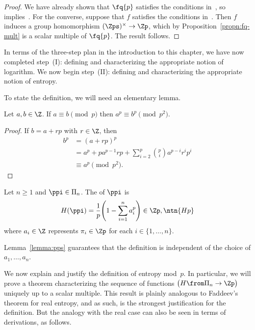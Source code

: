 \begin{proof}
We have already shown that $\fq{p}$ satisfies the conditions
in~, so~
implies~.  For the converse, suppose that $f$
satisfies the conditions in~.  Then $f$ induces a
group homomorphism $(\Zps)^\times \to \Zp$, which by
Proposition~\ref{propn:fq-mult} is a scalar multiple of $\fq{p}$.  The
result follows.
\end{proof}

In terms of the three-step plan in the introduction to this chapter, we
have now completed step~(I): defining and characterizing the appropriate
notion of logarithm.  We now begin step~(II): defining and characterizing
the appropriate notion of entropy.

To state the definition, we will need an elementary lemma.

\begin{lemma}
Let $a, b \in \Z$.  If $a \equiv b \pmod{p}$ then $a^p \equiv b^p
\pmod{p^2}$. 
\end{lemma}

\begin{proof}
If $b = a + rp$ with $r \in \Z$, then
% 
\begin{align*}
b^p     &
= 
(a + rp)^p      \\
&
=
a^p + p a^{p - 1} rp + \sum_{i = 2}^p \binom{p}{i} a^{p - i} r^i p^i    \\
&
\equiv
a^p
\pmod{p^2}.
\end{align*}
% 
\end{proof}


\begin{defn}
Let $n \geq 1$ and $\ppi \in \Pi_n$.  The
%
%
% 
of $\ppi$ is
\[
H(\ppi) 
= 
\frac{1}{p} \Biggl( 1 - \sum_{i = 1}^n a_i^p \Biggr)
\in \Zp,
\ntn{Hp}
\]
where $a_i \in \Z$ represents $\pi_i \in \Zp$ for each $i \in \{1,
\ldots, n\}$. 
\end{defn}

Lemma~\ref{lemma:pps} guarantees that the definition is independent of the
choice of $a_1, \ldots, a_n$.  

We now explain and justify the definition of entropy mod~$p$.  In
particular, we will prove a theorem characterizing the sequence of
functions $\bigl( H \from \Pi_n \to \Zp \bigr)$ uniquely up to a scalar
multiple.  This result is plainly analogous to Faddeev's theorem for real
entropy, and as such, is the strongest justification for the definition.
But the analogy with the real case can also be seen in terms of
derivations, as follows.

